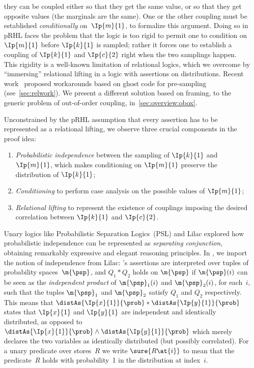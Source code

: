 they can be coupled either so that they get the same value,
or so that they get opposite values (the marginals are the same).
One or the other coupling must be established
\emph{conditionally} on~$\Ip{m}{1}$, to formalize this argument.
Doing so in pRHL faces the problem that the logic is too rigid to permit one to
condition on $\Ip{m}{1}$ before $\Ip{k}{1}$ is sampled; rather it forces one to establish a coupling of $\Ip{k}{1}$ and $\Ip{c}{2}$ right when the two samplings happen.
This rigidity is a well-known limitation of relational logics,
which we overcome by ``immersing'' relational lifting
in a logic with assertions on distributions.
Recent work~\cite{gregersen2023asynchronous}
proposed workarounds based on ghost code for pre-sampling
(see~\cref{sec:relwork}).
We present a different solution based on framing, to the generic problem of out-of-order coupling, in~\cref{sec:overview:obox}.

Unconstrained by the pRHL assumption that every assertion has to be represented as a relational lifting, we observe three crucial components in the proof idea:
\begin{enumerate}
\item
  \emph{Probabilistic independence}
  between the sampling of $\Ip{k}{1}$ and $\Ip{m}{1}$,
  which makes conditioning on $\Ip{m}{1}$ preserve the
  distribution of $\Ip{k}{1}$;
\item
  \emph{Conditioning} to perform case analysis
  on the possible values of $\Ip{m}{1}$;
\item
  \emph{Relational lifting}
  to represent the existence of couplings imposing the desired
  correlation between $\Ip{k}{1}$ and $\Ip{c}{2}$.
\end{enumerate}
Unary logics like
  Probabilistic Separation Logics~(PSL)
  \cite{barthe2019probabilistic} and
  Lilac
explored how probabilistic independence
can be represented as \emph{separating conjunction},
obtaining remarkably expressive and elegant reasoning principles.
In \thelogic, we import the notion of independence from Lilac:
\thelogic's assertions are interpreted over
tuples of probability spaces~$\m{\psp}$,
and $ Q_1 * Q_2 $  holds on $\m{\psp}$ if
$\m{\psp}(i)$ can be seen as the \emph{independent product}
of $ \m{\psp}_1(i) $ and $\m{\psp}_2(i)$,
for each~$i$,
such that the tuples $\m{\psp}_1$ and $\m{\psp}_2$ satisfy $Q_1$ and $Q_2$
respectively.
This means that
  $\distAs{\Ip{x}{1}}{\prob} * \distAs{\Ip{y}{1}}{\prob}$
states that $\Ip{x}{1}$ and $\Ip{y}{1}$ are independent and identically distributed,
as opposed to
  $\distAs{\Ip{x}{1}}{\prob} \land \distAs{\Ip{y}{1}}{\prob}$
which merely declares the two variables as identically distributed
(but possibly correlated).
For a unary predicate over stores~$R$
we write $\sure{R\at{i}}$ to mean that
the predicate~$R$ holds with probability~1
in the distribution at index~$i$.

